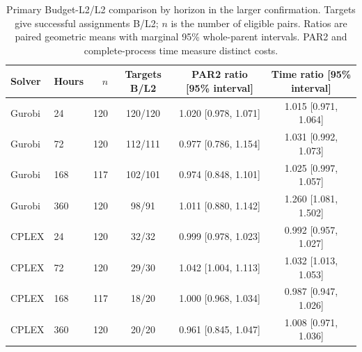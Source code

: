 \begin{table}[htbp]
\centering\small\setlength{\tabcolsep}{3pt}
\caption{Primary Budget-L2/L2 comparison by horizon in the larger confirmation.
Targets give successful assignments B/L2; $n$ is the number of eligible pairs.
Ratios are paired geometric means with marginal 95\% whole-parent intervals.
PAR2 and complete-process time measure distinct costs.}
\label{tab:orf-large-horizons}
\begin{tabular}{llrccc}\toprule
Solver & Hours & $n$ & Targets B/L2 & PAR2 ratio [95\% interval] & Time ratio [95\% interval]\\\midrule
Gurobi & 24 & 120 & 120/120 & 1.020 [0.978, 1.071] & 1.015 [0.971, 1.064]\\
Gurobi & 72 & 120 & 112/111 & 0.977 [0.786, 1.154] & 1.031 [0.992, 1.073]\\
Gurobi & 168 & 117 & 102/101 & 0.974 [0.848, 1.101] & 1.025 [0.997, 1.057]\\
Gurobi & 360 & 120 & 98/91 & 1.011 [0.880, 1.142] & 1.260 [1.081, 1.502]\\
CPLEX & 24 & 120 & 32/32 & 0.999 [0.978, 1.023] & 0.992 [0.957, 1.027]\\
CPLEX & 72 & 120 & 29/30 & 1.042 [1.004, 1.113] & 1.032 [1.013, 1.053]\\
CPLEX & 168 & 117 & 18/20 & 1.000 [0.968, 1.034] & 0.987 [0.947, 1.026]\\
CPLEX & 360 & 120 & 20/20 & 0.961 [0.845, 1.047] & 1.008 [0.971, 1.036]\\
\bottomrule\end{tabular}\end{table}
